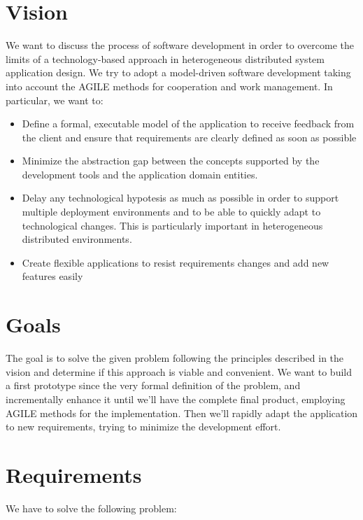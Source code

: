 \documentclass{llncs}
\newcommand{\labelsec}[1]{\label{sec:#1}}
\begin{document}
\section{Vision}
\labelsec{Vision}
We want to discuss the process of software development in order to overcome the limits of a technology-based approach in heterogeneous distributed system application design.
We try to adopt a model-driven software development taking into account the AGILE methods for cooperation and work management.
In particular, we want to:
\begin{itemize}
\item Define a formal, executable model of the application to receive feedback from the client and ensure that requirements are clearly defined as soon as possible 
\item Minimize the abstraction gap between the concepts supported by the development tools and the application domain entities.
\item Delay any technological hypotesis as much as possible in order to support multiple deployment environments and to be able to quickly adapt to technological changes. This is particularly important in heterogeneous distributed environments.
\item Create flexible applications to resist requirements changes and add new features easily
\end{itemize}
\section{Goals}
\labelsec{Goals}
The goal is to solve the given problem following the principles described in the vision and determine if this approach is viable and convenient. We want to build a first prototype since the very formal definition of the problem, and incrementally enhance it until we'll have the complete final product, employing AGILE methods for the implementation. Then we'll rapidly adapt the application to new requirements, trying to minimize the development effort.
\section{Requirements}
\labelsec{Requirements}
We have to solve the following problem:
\end{document}
